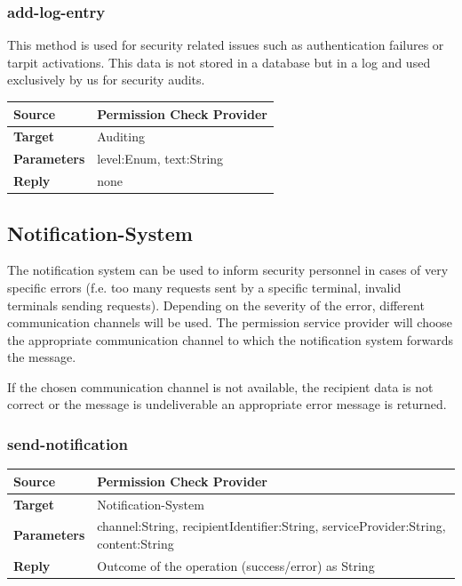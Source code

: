 \documentclass[12pt,a4paper,titlepage,oneside]{scrartcl}
\begin{document}
\subsubsection{add-log-entry}
This method is used for security related issues such as authentication failures or tarpit activations. This data is not stored in a database but in a log and used exclusively by us for security audits.

\begin{table}[h]
    \centering
    \begin{tabular}{|l|p{12cm}|} \hline
    \textbf{Source}&Permission Check Provider\\ \hline
    \textbf{Target}&Auditing\\ \hline
    \textbf{Parameters}&level:Enum, text:String\\ \hline
    \textbf{Reply}&none\\ \hline
    \end{tabular}
\end{table}

\subsection{Notification-System}
The notification system can be used to inform security personnel in cases of very specific errors (f.e. too many requests sent by a specific terminal, invalid terminals sending requests). Depending on the severity of the error, different communication channels will be used. The permission service provider will choose the appropriate communication channel to which the notification system forwards the message.

If the chosen communication channel is not available, the recipient data is not correct or the message is undeliverable an appropriate error message is returned.

\subsubsection{send-notification}
\begin{table}[h]
    \centering
    \begin{tabular}{|l|p{12cm}|} \hline
    \textbf{Source}&Permission Check Provider\\ \hline
    \textbf{Target}&Notification-System\\ \hline
    \textbf{Parameters}&channel:String, recipientIdentifier:String, serviceProvider:String, content:String\\ \hline
    \textbf{Reply}&Outcome of the operation (success/error) as String\\ \hline
    \end{tabular}
\end{table}
\end{document}
